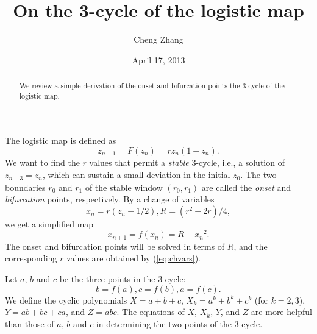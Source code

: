\documentclass[twocolumn,prl]{revtex4-1}
\begin{document}
\title{On the 3-cycle of the logistic map}
\author{Cheng Zhang}
\date{April 17, 2013}


\begin{abstract}
We review a simple derivation of
  the onset and bifurcation points the 3-cycle
  of the logistic map.
\end{abstract}
\maketitle


The logistic map is defined as
\[
  z_{n+1} = F(z_n) = r z_n (1 - z_n).
\]
We want to find the $r$ values that permit a \emph{stable} 3-cycle,
i.e., a solution of $z_{n+3} = z_n$,
which can sustain a small deviation in the initial $z_0$.
The two boundaries $r_0$ and $r_1$
  of the stable window $(r_0, r_1)$
  are called the \emph{onset} and \emph{bifurcation} points, respectively.
%
By a change of variables
\begin{equation}
  x_n = r (z_n - 1/2),
  R = (r^2 - 2 r)/4,
\label{eq:chvars}
\end{equation}
we get a simplified map
\[
x_{n+1} = f(x_n) = R - {x_n}^2.
\]
The onset and bifurcation points will be solved
  in terms of $R$, and the corresponding $r$ values
  are obtained by (\ref{eq:chvars}).


Let $a$, $b$ and $c$ be the three points in the 3-cycle:
\begin{equation}
  b=f(a), c=f(b), a=f(c).
\label{eq:abc}
\end{equation}
We define the cyclic polynomials
$X = a+b+c$,
$X_k = a^k+b^k+c^k$ (for $k = 2,3$),
$Y = ab+bc+ca$, and $Z = abc$.
The equations of $X$, $X_k$, $Y$, and $Z$
are more helpful than those of $a$, $b$ and $c$
in determining the two points of the 3-cycle.
\end{document}

